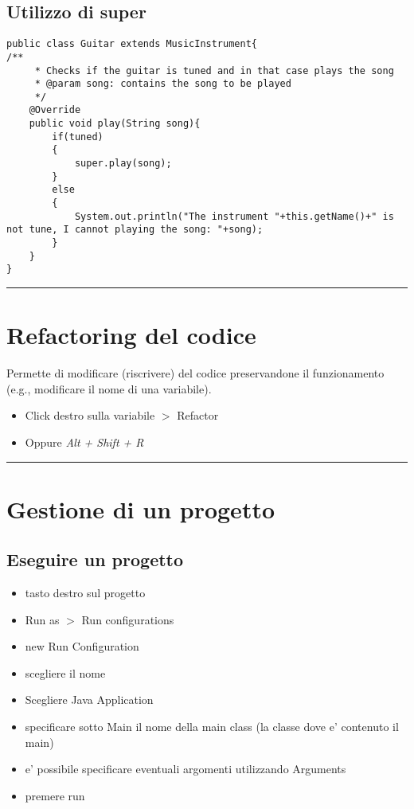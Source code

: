 \documentclass{article}
\begin{document}
\subsection{Utilizzo di super}
\begin{lstlisting}
public class Guitar extends MusicInstrument{
/**
	 * Checks if the guitar is tuned and in that case plays the song
	 * @param song: contains the song to be played
	 */
	@Override
	public void play(String song){
		if(tuned)
		{
		    super.play(song);
		}
		else
		{
			System.out.println("The instrument "+this.getName()+" is not tune, I cannot playing the song: "+song);
		}
	}
}
\end{lstlisting}

\hrule


\section{Refactoring del codice}
Permette di modificare (riscrivere) del codice preservandone il funzionamento (e.g., modificare il nome di una variabile).
\begin{itemize}
\item Click destro sulla variabile $>$ Refactor 
\item Oppure \textit{Alt + Shift + R}
\end{itemize}

\hrule
\section{Gestione di un progetto}
\subsection{Eseguire un progetto}
\begin{itemize}
\item tasto destro sul progetto 
\item Run as $>$ Run configurations
\item new Run Configuration 
\item scegliere il nome
\item Scegliere Java Application
\item specificare sotto Main il nome della main class (la classe dove e' contenuto il main)
\item e' possibile specificare eventuali argomenti utilizzando Arguments 
\item premere run
\end{itemize}
\end{document}
